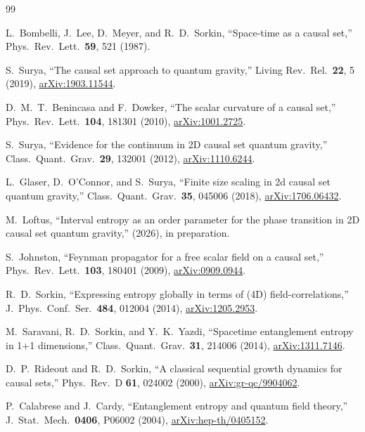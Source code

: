 \documentclass[aps,prd,twocolumn,superscriptaddress,nofootinbib]{revtex4-2}
\begin{document}
\begin{thebibliography}{99}

L.~Bombelli, J.~Lee, D.~Meyer, and R.~D.~Sorkin,
``Space-time as a causal set,''
Phys.\ Rev.\ Lett.\ \textbf{59}, 521 (1987).

S.~Surya,
``The causal set approach to quantum gravity,''
Living Rev.\ Rel.\ \textbf{22}, 5 (2019),
\href{https://arxiv.org/abs/1903.11544}{arXiv:1903.11544}.

D.~M.~T.~Benincasa and F.~Dowker,
``The scalar curvature of a causal set,''
Phys.\ Rev.\ Lett.\ \textbf{104}, 181301 (2010),
\href{https://arxiv.org/abs/1001.2725}{arXiv:1001.2725}.

S.~Surya,
``Evidence for the continuum in 2D causal set quantum gravity,''
Class.\ Quant.\ Grav.\ \textbf{29}, 132001 (2012),
\href{https://arxiv.org/abs/1110.6244}{arXiv:1110.6244}.

L.~Glaser, D.~O'Connor, and S.~Surya,
``Finite size scaling in 2d causal set quantum gravity,''
Class.\ Quant.\ Grav.\ \textbf{35}, 045006 (2018),
\href{https://arxiv.org/abs/1706.06432}{arXiv:1706.06432}.

M.~Loftus,
``Interval entropy as an order parameter for the phase transition in 2D causal set quantum gravity,''
(2026), in preparation.

S.~Johnston,
``Feynman propagator for a free scalar field on a causal set,''
Phys.\ Rev.\ Lett.\ \textbf{103}, 180401 (2009),
\href{https://arxiv.org/abs/0909.0944}{arXiv:0909.0944}.

R.~D.~Sorkin,
``Expressing entropy globally in terms of (4D) field-correlations,''
J.\ Phys.\ Conf.\ Ser.\ \textbf{484}, 012004 (2014),
\href{https://arxiv.org/abs/1205.2953}{arXiv:1205.2953}.

M.~Saravani, R.~D.~Sorkin, and Y.~K.~Yazdi,
``Spacetime entanglement entropy in 1+1 dimensions,''
Class.\ Quant.\ Grav.\ \textbf{31}, 214006 (2014),
\href{https://arxiv.org/abs/1311.7146}{arXiv:1311.7146}.

D.~P.~Rideout and R.~D.~Sorkin,
``A classical sequential growth dynamics for causal sets,''
Phys.\ Rev.\ D \textbf{61}, 024002 (2000),
\href{https://arxiv.org/abs/gr-qc/9904062}{arXiv:gr-qc/9904062}.

P.~Calabrese and J.~Cardy,
``Entanglement entropy and quantum field theory,''
J.\ Stat.\ Mech.\ \textbf{0406}, P06002 (2004),
\href{https://arxiv.org/abs/hep-th/0405152}{arXiv:hep-th/0405152}.


\end{thebibliography}
\end{document}
